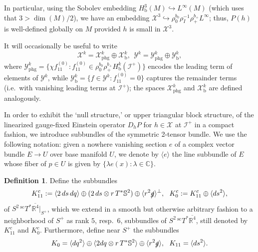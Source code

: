 \documentclass[reqno,11pt,letterpaper]{amsart}
\numberwithin{equation}{section}
\numberwithin{figure}{section}
\theoremstyle{definition}
\newtheorem{definition}[thm]{Definition}
\theoremstyle{remark}
\newcommand{\mc}{\mathcal}
\newcommand{\cX}{\mc X}
\newcommand{\cY}{\mc Y}
\newcommand{\ms}{\mathscr}
\newcommand{\scri}{\ms I}
\newcommand{\C}{\mathbb{C}}
\newcommand{\R}{\mathbb{R}}
\newcommand{\Sph}{\mathbb{S}}
\newcommand{\slg}{\slashed{g}{}}
\newcommand{\hra}{\hookrightarrow}
\newcommand{\la}{\langle}
\newcommand{\ol}{\overline}
\newcommand{\ra}{\rangle}
\newcommand{\bop}{{\mathrm{b}}}
\newcommand{\scl}{{\mathrm{sc}}}
\newcommand{\Tsc}{{}^{\scl}T}
\newcommand{\Hb}{H_{\bop}}
\newcommand{\phg}{{\mathrm{phg}}}
\begin{document}
In particular, using the Sobolev embedding $\Hb^3(M)\hra L^\infty(M)$ (which uses that $3>\dim(M)/2$), we have an embedding $\cX^3\hra\rho_0^{b_0}\rho_I^{-1}\rho_+^{b_+}L^\infty$; thus, $P(h)$ is well-defined globally on $M$ provided $h$ is small in $\cX^3$.

It will occasionally be useful to write
\begin{equation}
\label{EqEinFDecomp}
  \cX^k = \cX^k_\phg \oplus \cX^k_\bop, \ \ 
  \cY^k = \cY^k_\phg \oplus \cY^k_\bop,
\end{equation}
where $\cY^k_\phg=\{ \chi f_{1 1}^{(0)} \colon f_{1 1}^{(0)}\in \rho_0^{b_0}\rho_+^{b_+}\Hb^k(\scri^+) \}$ encodes the leading term of elements of $\cY^k$, while $\cY^k_\bop=\{f\in\cY^k\colon f_{1 1}^{(0)}=0\}$ captures the remainder terms (i.e.\ with vanishing leading terms at $\scri^+$); the spaces $\cX^k_\phg$ and $\cX^k_\bop$ are defined analogously.

In order to exhibit the `null structure,' or upper triangular block structure, of the linearized gauge-fixed Einstein operator $D_h P$ for $h\in\cX$ at $\scri^+$ in a compact fashion, we introduce subbundles of the symmetric 2-tensor bundle. We use the following notation: given a nowhere vanishing section $e$ of a complex vector bundle $E\to U$ over base manifold $U$, we denote by $\la e\ra$ the line subbundle of $E$ whose fiber of $p\in U$ is given by $\{\lambda e(x)\colon\lambda\in\C\}$.

\begin{definition}
\label{DefEinFSubb}
  Define the subbundles
  \[
    K_{1 1}^c := \la 2\,ds\,dq\ra \oplus (2\,ds\otimes r\,T^*\Sph^2) \oplus \la r^2\slg \ra^\perp,\ \ 
    K_0^c := K_{1 1}^c \oplus \la ds^2\ra,
  \]
  of $S^2\,\Tsc^*\ol{\R^4}|_{S^+}$, which we extend in a smooth but otherwise arbitrary fashion to a neighborhood of $S^+$ as rank $5$, resp.\ $6$, subbundles of $S^2\,\Tsc^*\ol{\R^4}$, still denoted by $K_{1 1}^c$ and $K_0^c$. Furthermore, define near $S^+$ the subbundles
  \begin{equation}
  \label{EqEinFK0}
    K_0=\la dq^2\ra\oplus\la 2 dq\otimes r\,T^*\Sph^2\ra\oplus\la r^2\slg\ra,\ \ 
    K_{1 1}=\la ds^2\ra.
  \end{equation}
\end{definition}
\end{document}
